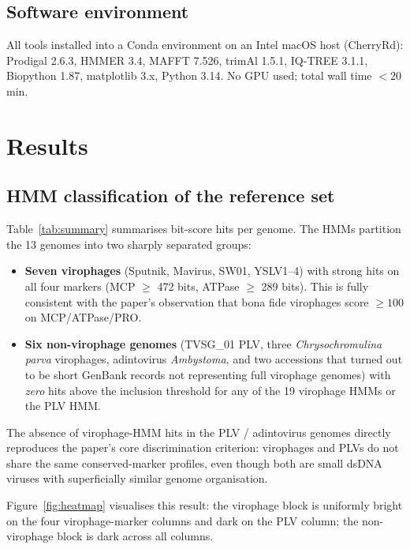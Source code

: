 \documentclass[11pt,a4paper]{article}
\begin{document}
\subsection{Software environment}
All tools installed into a Conda environment on an Intel macOS host
(CherryRd):
Prodigal 2.6.3, HMMER 3.4, MAFFT 7.526, trimAl 1.5.1, IQ-TREE 3.1.1,
Biopython 1.87, matplotlib 3.x, Python 3.14. No GPU used; total wall time
$<\!20$\,min.

\section{Results}

\subsection{HMM classification of the reference set}

Table~\ref{tab:summary} summarises bit-score hits per genome. The HMMs
partition the 13 genomes into two sharply separated groups:
\begin{itemize}[leftmargin=1.4em]
  \item \textbf{Seven virophages} (Sputnik, Mavirus, SW01, YSLV1--4) with
        strong hits on all four markers (MCP $\geq$ 472 bits, ATPase
        $\geq$ 289 bits). This is fully consistent with the paper's
        observation that bona fide virophages score $\geq 100$ on MCP/ATPase/PRO.
  \item \textbf{Six non-virophage genomes} (TVSG\_01 PLV, three
        \emph{Chrysochromulina parva} virophages, adintovirus
        \emph{Ambystoma}, and two accessions that turned out to be short
        GenBank records not representing full virophage genomes) with
        \emph{zero} hits above the inclusion threshold for any of the 19
        virophage HMMs or the PLV HMM.
\end{itemize}
The absence of virophage-HMM hits in the PLV / adintovirus genomes
directly reproduces the paper's core discrimination criterion: virophages
and PLVs do not share the same conserved-marker profiles, even though both
are small dsDNA viruses with superficially similar genome organisation.



Figure~\ref{fig:heatmap} visualises this result: the virophage block is
uniformly bright on the four virophage-marker columns and dark on the PLV
column; the non-virophage block is dark across all columns.
\end{document}
